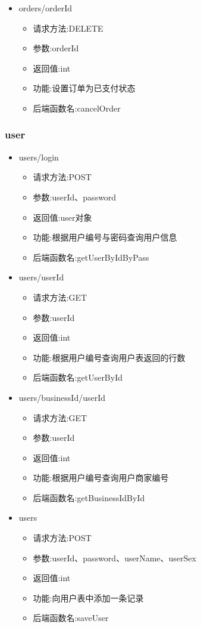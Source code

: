 \begin{itemize}
\item orders/{orderId}
\begin{itemize}
    \item 请求方法:DELETE
    \item 参数:orderId
    \item 返回值:int
    \item 功能:设置订单为已支付状态
    \item 后端函数名:cancelOrder
\end{itemize}
\end{itemize}

\subsubsection*{user}
\begin{itemize}
\item users/login
\begin{itemize}
    \item 请求方法:POST
    \item 参数:userId、password
    \item 返回值:user对象
    \item 功能:根据用户编号与密码查询用户信息
    \item 后端函数名:getUserByIdByPass
\end{itemize}

\item users/{userId}
\begin{itemize}
    \item 请求方法:GET
    \item 参数:userId
    \item 返回值:int
    \item 功能:根据用户编号查询用户表返回的行数
    \item 后端函数名:getUserById
\end{itemize}

\item users/businessId/{userId}
\begin{itemize}
    \item 请求方法:GET
    \item 参数:userId
    \item 返回值:int
    \item 功能:根据用户编号查询用户商家编号
    \item 后端函数名:getBusinessIdById
\end{itemize}

\item users
\begin{itemize}
    \item 请求方法:POST
    \item 参数:userId、password、userName、userSex
    \item 返回值:int
    \item 功能:向用户表中添加一条记录
    \item 后端函数名:saveUser
\end{itemize}


\end{itemize}
